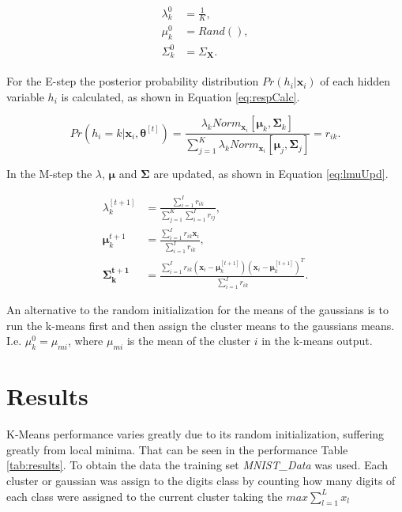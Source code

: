 \documentclass[12pt]{article}
\begin{document}
\begin{align}
\begin{split}
\label{eq:mixInit}
\lambda_k^0 &= \frac{1}{K},\\
\mu_k^0 &= Rand(),\\
\Sigma_k^0 &= \Sigma_{\mathbf{X}}.
\end{split}
\end{align}

For the E-step the posterior probability distribution $Pr(h_i|\mathbf{x}_i)$ of each hidden variable $h_i$ is calculated, as shown in Equation \ref{eq:respCalc}.

\begin{equation}
\label{eq:respCalc}
Pr(h_i = k|\mathbf{x}_i, \boldsymbol{\theta}^{[t]}) = \frac{\lambda_k Norm_{\mathbf{x}_i} \left[ \boldsymbol{\mu}_k, \mathbf{\Sigma}_k \right] } { \sum_{j=1}^K \lambda_k Norm_{\mathbf{x}_i} \left[ \boldsymbol{\mu}_j, \mathbf{\Sigma}_j \right] } = r_{ik}.
\end{equation}

In the M-step the $\lambda$, $\boldsymbol\mu$ and $\mathbf{\Sigma}$ are updated, as shown in Equation \ref{eq:lmuUpd}.

\begin{equation}
\begin{split}
\label{eq:lmuUpd}
\lambda_k^{[t+1]} &= \frac{\sum_{i=1}^I r_{ik}} {\sum_{j=1}^K \sum_{i=1}^I r_{ij}},\\
\boldsymbol \mu_k^{t+1} &= \frac{\sum_{i=1}^I r_{ik} \mathbf{x}_i}{\sum_{i=1}^Ir_{ik}},\\
\mathbf{\Sigma_k^{t+1}} &= \frac{\sum_{i=1}^I r_{ik} ( \mathbf{x}_i - \boldsymbol{\mu}_k^{[t+1]} ) ( \mathbf{x}_i - \boldsymbol{\mu}_k^{[t+1]} )^T } {\sum_{i=1}^Ir_{ik}}.
\end{split}
\end{equation}

An alternative to the random initialization for the means of the gaussians is to run the k-means first and then assign the cluster means to the gaussians means.
I.e. $\mu^0_k = \mu_{mi}$, where $\mu_{mi}$ is the mean of the cluster $i$ in the k-means output. 

\section{Results}

K-Means performance varies greatly due to its random initialization, suffering greatly from local minima.
That can be seen in the performance Table \ref{tab:results}.
To obtain the data the training set \emph{MNIST\_Data} was used.
Each cluster or gaussian was assign to the digits class by counting how many digits of each class were assigned to the current cluster taking the 
$max \sum_{l=1}^{L} x_{l}$ 
\end{document}
